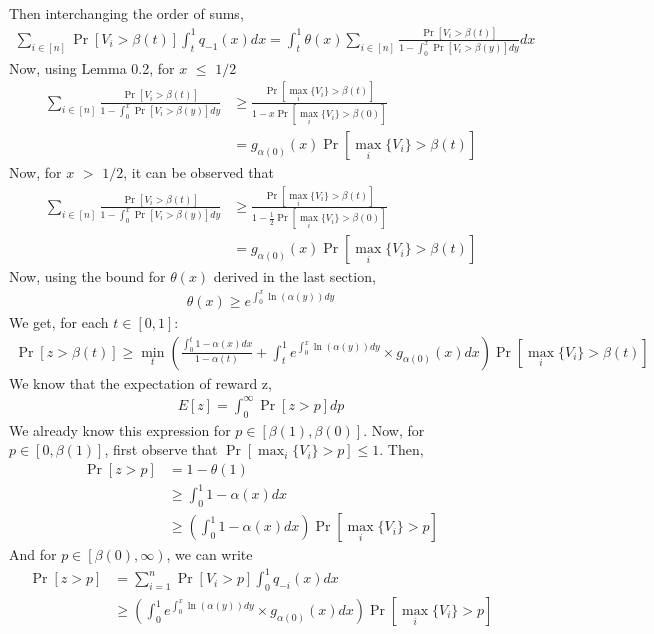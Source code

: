 \documentclass[10pt, letterpaper, twoside]{article}
\begin{document}
	Then interchanging the order of sums,
	\begin{align*}
	\sum_{i \in [n]} \Pr[V_{i} > \beta(t)] \int_{t}^{1} q_{-1}(x) dx = \int_{t}^{1} \theta(x) \sum_{i \in [n]} \frac{\Pr[V_{i} > \beta(t)]}{1 - \int_{0}^{x} \Pr[V_{i} > \beta(y)] dy} dx
	\end{align*}
	Now, using Lemma 0.2, for $x$ $\leq$ $1/2$
	\begin{align*}
	\sum_{i \in [n]} \frac{\Pr[V_{i} > \beta(t)]}{1 - \int_{0}^{x} \Pr[V_{i} > \beta(y)] dy} &\geq \frac{\Pr[\max_{i} \{V_{i}\} > \beta(t)]}{1-x\Pr[\max_{i} \{V_{i}\} > \beta(0)]}\\
	&= g_{\alpha(0)} (x) \Pr[\max_{i} \{V_{i}\} > \beta(t)]
	\end{align*}
	Now, for $x$ $>$ $1/2$, it can be observed that \\
	\begin{align*}
	\sum_{i \in [n]} \frac{\Pr[V_{i} > \beta(t)]}{1 - \int_{0}^{x} \Pr[V_{i} > \beta(y)] dy} &\geq \frac{\Pr[\max_{i} \{V_{i}\} > \beta(t)]}{1-\frac{1}{2}\Pr[\max_{i} \{V_{i}\} > \beta(0)]} \\
	&= g_{\alpha(0)} (x) \Pr[\max_{i} \{V_{i}\} > \beta(t)]
	\end{align*}
	Now, using the bound for $\theta(x)$ derived in the last section,
	\begin{align*}
	\theta(x) \geq e^{\int_{0}^{x} \ln(\alpha(y)) dy}
	\end{align*}
	We get, for each $t \in [0,1]$:
	\begin{align*}
	\Pr[z > \beta(t)] \geq \min_{t}\left(\frac{\int_{0}^{t} 1 - \alpha(x) dx}{1-\alpha(t)} + \int_{t}^{1} e^{\int_{0}^{x} \ln(\alpha(y)) dy} \times g_{\alpha(0)}(x) dx \right) \Pr[\max_{i} \{V_{i}\} > \beta(t)]
	\end{align*}
	We know that the expectation of reward z,
	\begin{align*}
	E[z] = \int_{0}^{\infty} \Pr[z > p] dp
	\end{align*}
	We already know this expression for $p \in [\beta(1),\beta(0)]$. Now, for $p \in [0,\beta(1)]$, first observe that $\Pr[\max_{i} \{V_{i}\} > p]\leq 1$. Then,
	\begin{align*}
	\Pr[z > p] &= 1 - \theta(1)\\
	&\geq \int_{0}^{1} 1 - \alpha(x) dx \\
	&\geq\left(\int_{0}^{1} 1 - \alpha(x) dx \right) \Pr[\max_{i} \{V_{i}\} > p]
	\end{align*}
	And for $p \in\left [\beta(0),\infty\right)$, we can write
	\begin{align*}
	\Pr[z > p] &= \sum_{i=1}^{n} \Pr[V_{i} > p] \int_{0}^{1} q_{-i} (x) dx\\
	&\geq \left(\int_{0}^{1} e^{\int_{0}^{x} \ln(\alpha(y)) dy} \times g_{\alpha(0)}(x) dx \right) \Pr[\max_{i} \{V_{i}\} > p]
	\end{align*}
\end{document}
